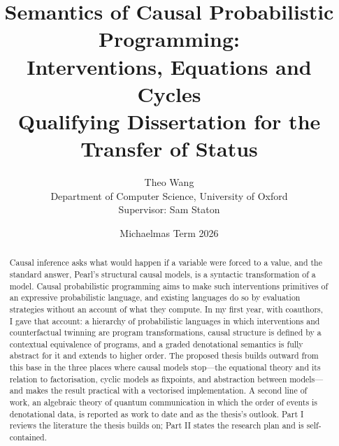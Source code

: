 
\title{Semantics of Causal Probabilistic Programming:\\ Interventions, Equations and Cycles\\[1ex]
\large Qualifying Dissertation for the Transfer of Status}
\author{Theo Wang\\ \small Department of Computer Science, University of Oxford\\ \small Supervisor: Sam Staton}
\date{Michaelmas Term 2026}


\maketitle

\begin{abstract}
\noindent
Causal inference asks what would happen if a variable were forced to a value, and the standard answer, Pearl's structural causal models, is a syntactic transformation of a model. Causal probabilistic programming aims to make such interventions primitives of an expressive probabilistic language, and existing languages do so by evaluation strategies without an account of what they compute. In my first year, with coauthors, I gave that account: a hierarchy of probabilistic languages in which interventions and counterfactual twinning are program transformations, causal structure is defined by a contextual equivalence of programs, and a graded denotational semantics is fully abstract for it and extends to higher order. The proposed thesis builds outward from this base in the three places where causal models stop---the equational theory and its relation to factorisation, cyclic models as fixpoints, and abstraction between models---and makes the result practical with a vectorised implementation. A second line of work, an algebraic theory of quantum communication in which the order of events is denotational data, is reported as work to date and as the thesis's outlook. Part I reviews the literature the thesis builds on; Part II states the research plan and is self-contained.
\end{abstract}

\tableofcontents



\printbibliography


